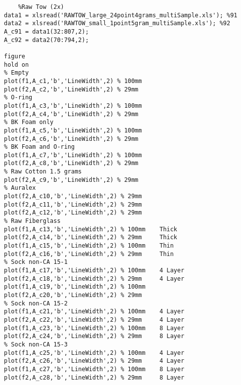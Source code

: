 \begin{verbatim}
    %Raw Tow (2x)
data1 = xlsread('RAWTOW_large_24point4grams_multiSample.xls'); %91
data2 = xlsread('RAWTOW_small_1point5gram_multiSample.xls'); %92
A_c91 = data1(32:807,2);
A_c92 = data2(70:794,2);

figure
hold on
% Empty
plot(f1,A_c1,'b','LineWidth',2) % 100mm
plot(f2,A_c2,'b','LineWidth',2) % 29mm
% O-ring
plot(f1,A_c3,'b','LineWidth',2) % 100mm
plot(f2,A_c4,'b','LineWidth',2) % 29mm
% BK Foam only
plot(f1,A_c5,'b','LineWidth',2) % 100mm
plot(f2,A_c6,'b','LineWidth',2) % 29mm
% BK Foam and O-ring
plot(f1,A_c7,'b','LineWidth',2) % 100mm
plot(f2,A_c8,'b','LineWidth',2) % 29mm
% Raw Cotton 1.5 grams
plot(f2,A_c9,'b','LineWidth',2) % 29mm
% Auralex
plot(f2,A_c10,'b','LineWidth',2) % 29mm
plot(f2,A_c11,'b','LineWidth',2) % 29mm
plot(f2,A_c12,'b','LineWidth',2) % 29mm
% Raw Fiberglass
plot(f1,A_c13,'b','LineWidth',2) % 100mm    Thick
plot(f2,A_c14,'b','LineWidth',2) % 29mm     Thick
plot(f1,A_c15,'b','LineWidth',2) % 100mm    Thin
plot(f2,A_c16,'b','LineWidth',2) % 29mm     Thin
% Sock non-CA 15-1
plot(f1,A_c17,'b','LineWidth',2) % 100mm    4 Layer
plot(f2,A_c18,'b','LineWidth',2) % 29mm     4 Layer
plot(f1,A_c19,'b','LineWidth',2) % 100mm
plot(f2,A_c20,'b','LineWidth',2) % 29mm
% Sock non-CA 15-2
plot(f1,A_c21,'b','LineWidth',2) % 100mm    4 Layer
plot(f2,A_c22,'b','LineWidth',2) % 29mm     4 Layer
plot(f1,A_c23,'b','LineWidth',2) % 100mm    8 Layer
plot(f2,A_c24,'b','LineWidth',2) % 29mm     8 Layer
% Sock non-CA 15-3
plot(f1,A_c25,'b','LineWidth',2) % 100mm    4 Layer
plot(f2,A_c26,'b','LineWidth',2) % 29mm     4 Layer
plot(f1,A_c27,'b','LineWidth',2) % 100mm    8 Layer
plot(f2,A_c28,'b','LineWidth',2) % 29mm     8 Layer


\end{verbatim}
